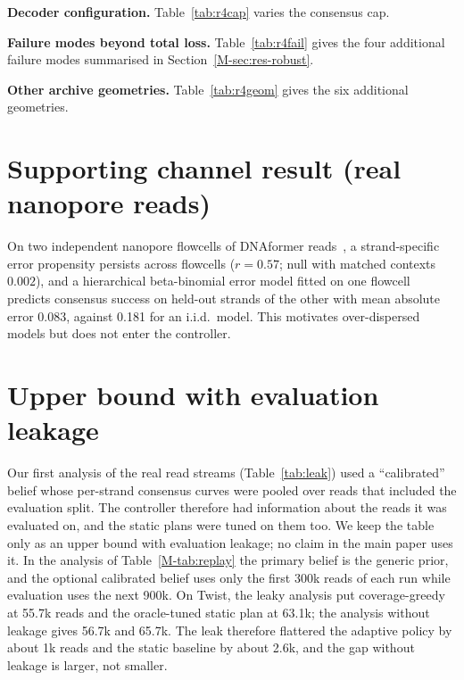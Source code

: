 \documentclass[conference,onecolumn,11pt]{IEEEtran}
\begin{document}
\textbf{Decoder configuration.}  Table~\ref{tab:r4cap} varies the consensus cap.


\textbf{Failure modes beyond total loss.}  Table~\ref{tab:r4fail} gives the four additional failure
modes summarised in Section~\ref{M-sec:res-robust}.


\textbf{Other archive geometries.}  Table~\ref{tab:r4geom} gives the six additional geometries.


\section{Supporting channel result (real nanopore reads)}\label{supp:nanopore}
On two independent nanopore flowcells of DNAformer reads~\cite{barlev2025deep,technion2025dnaformerreads},
a strand-specific error propensity persists across flowcells ($r{=}0.57$; null with matched contexts
$0.002$), and a hierarchical beta-binomial error model fitted on one flowcell predicts consensus success
on held-out strands of the other with mean absolute error 0.083, against 0.181 for an i.i.d.\ model.  This
motivates over-dispersed models but does not enter the controller.

\section{Upper bound with evaluation leakage}\label{app:leak}
Our first analysis of the real read streams (Table~\ref{tab:leak}) used a ``calibrated'' belief whose
per-strand consensus curves were pooled over reads that included the evaluation split.  The controller
therefore had information about the reads it was evaluated on, and the static plans were tuned on them
too.  We keep the table only as an upper bound with evaluation leakage; no claim in the main paper uses
it.  In the analysis of Table~\ref{M-tab:replay} the primary belief is the generic prior, and the optional
calibrated belief uses only the first 300k reads of each run while evaluation uses the next 900k.  On
Twist, the leaky analysis put coverage-greedy at 55.7k reads and the oracle-tuned static plan at 63.1k;
the analysis without leakage gives 56.7k and 65.7k.  The leak therefore flattered the adaptive policy by
about 1k reads and the static baseline by about 2.6k, and the gap without leakage is larger, not smaller.

\end{document}
